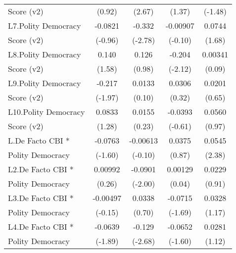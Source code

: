 {\begin{tabular}{l*{4}{c}}
Score (v2)          &      (0.92)         &      (2.67)         &      (1.37)         &     (-1.48)         \\
[1em]
L7.Polity Democracy &     -0.0821         &      -0.332\sym{**} &    -0.00907         &      0.0744         \\
Score (v2)          &     (-0.96)         &     (-2.78)         &     (-0.10)         &      (1.68)         \\
[1em]
L8.Polity Democracy &       0.140         &       0.126         &      -0.204\sym{*}  &     0.00341         \\
Score (v2)          &      (1.58)         &      (0.98)         &     (-2.12)         &      (0.09)         \\
[1em]
L9.Polity Democracy &      -0.217\sym{*}  &      0.0133         &      0.0306         &      0.0201         \\
Score (v2)          &     (-1.97)         &      (0.10)         &      (0.32)         &      (0.65)         \\
[1em]
L10.Polity Democracy&      0.0833         &      0.0155         &     -0.0393         &      0.0560         \\
Score (v2)          &      (1.28)         &      (0.23)         &     (-0.61)         &      (0.97)         \\
[1em]
L.De Facto CBI *    &     -0.0763         &    -0.00613         &      0.0375         &      0.0545\sym{*}  \\
Polity Democracy    &     (-1.60)         &     (-0.10)         &      (0.87)         &      (2.38)         \\
[1em]
L2.De Facto CBI *   &     0.00992         &     -0.0901\sym{*}  &     0.00129         &      0.0229         \\
Polity Democracy    &      (0.26)         &     (-2.00)         &      (0.04)         &      (0.91)         \\
[1em]
L3.De Facto CBI *   &    -0.00497         &      0.0338         &     -0.0715         &      0.0328         \\
Polity Democracy    &     (-0.15)         &      (0.70)         &     (-1.69)         &      (1.17)         \\
[1em]
L4.De Facto CBI *   &     -0.0639         &      -0.129\sym{**} &     -0.0652         &      0.0281         \\
Polity Democracy    &     (-1.89)         &     (-2.68)         &     (-1.60)         &      (1.12)         \\

\end{tabular}}
